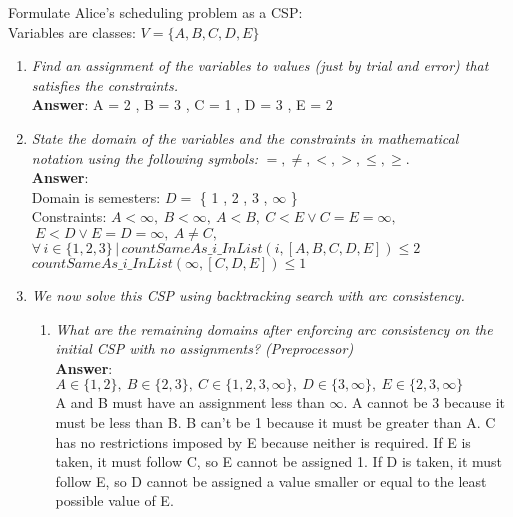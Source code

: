 \documentclass[fleqn]{hermans-hw}
\begin{document}
Formulate Alice's scheduling problem as a CSP:\\
Variables are classes: $ V = \lbrace A,B,C,D,E  \rbrace $ \\


\begin{enumerate}
\item \textit{Find an assignment of the variables to values (just by trial and
error) that satisfies the constraints.}\\
\textbf{Answer}: A = 2 , B = 3 , C = 1 , D = 3 , E = 2

\item \textit{ State the domain of the variables and the constraints in
mathematical notation using the following symbols: } $=, \neq, <, >,
\leq, \geq$. \\
\textbf{Answer}:\\
Domain is semesters: $D=$ \{ 1 , 2 , 3 , $\infty$ \} \\
Constraints: $ A < \infty, \ B < \infty, \ A < B, \  C < E \vee C=E=\infty,$ \\ $ \ E < D \vee E=D=\infty, \ A \neq C,$ \\ 
$ \forall \, i \in \lbrace 1,2,3  \rbrace \, | \, countSameAs\_i\_InList(i,[A,B,C,D,E]) \leq 2$\\
$countSameAs\_i\_InList(\infty,[C,D,E]) \leq 1$


\item \textit{We now solve this CSP using backtracking search with arc
consistency.}


\begin{enumerate}
\item \textit{What are the remaining domains after enforcing arc consistency on
the initial CSP with no assignments? (Preprocessor)} \\
\textbf{Answer}: \\
$ A \in \lbrace 1,2 \rbrace, 
\ B \in \lbrace 2,3 \rbrace, 
\ C \in \lbrace 1,2,3,\infty \rbrace, 
\ D \in \lbrace 3,\infty \rbrace, 
\ E \in \lbrace 2,3,\infty \rbrace$\\
A and B must have an assignment less than $\infty$. A cannot be 3 because it must be less than B. B can't be 1 because it must be greater than A. C has no restrictions imposed by E because neither is required. If E is taken, it must follow C, so E cannot be assigned 1. If D is taken, it must follow E, so D cannot be assigned a value smaller or equal to the least possible value of E.


\end{enumerate}
\end{enumerate}
\end{document}
